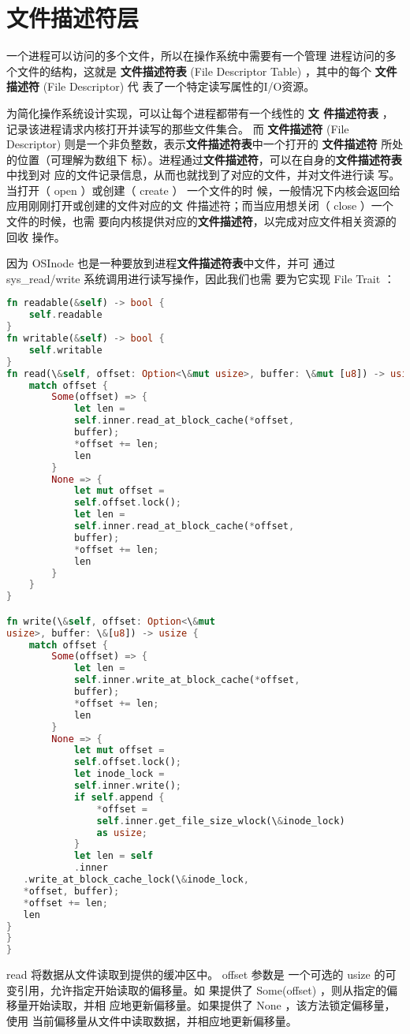 \section{文件描述符层}
一个进程可以访问的多个文件，所以在操作系统中需要有一个管理
进程访问的多个文件的结构，这就是 \textbf{文件描述符表} (File
Descriptor Table) ，其中的每个 \textbf{文件描述符} (File Descriptor) 代
表了一个特定读写属性的I/O资源。

为简化操作系统设计实现，可以让每个进程都带有一个线性的 \textbf{文
件描述符表} ，记录该进程请求内核打开并读写的那些文件集合。
而 \textbf{文件描述符} (File Descriptor) 则是一个非负整数，表示\textbf{文件描述符表}中一个打开的\textbf{ 文件描述符} 所处的位置（可理解为数组下
标）。进程通过\textbf{文件描述符}，可以在自身的\textbf{文件描述符表}中找到对
应的文件记录信息，从而也就找到了对应的文件，并对文件进行读
写。当打开（ open ）或创建（ create ） 一个文件的时
候，一般情况下内核会返回给应用刚刚打开或创建的文件对应的文
件描述符；而当应用想关闭（ close ）一个文件的时候，也需
要向内核提供对应的\textbf{文件描述符}，以完成对应文件相关资源的回收
操作。

因为 OSInode 也是一种要放到进程\textbf{文件描述符表}中文件，并可
通过 sys\_read/write 系统调用进行读写操作，因此我们也需
要为它实现 File Trait ：
\begin{lstlisting}[language=Rust]
fn readable(&self) -> bool {
	self.readable
}
fn writable(&self) -> bool {
	self.writable
}
fn read(\&self, offset: Option<\&mut usize>, buffer: \&mut [u8]) -> usize {
	match offset {
		Some(offset) => {
			let len =
			self.inner.read_at_block_cache(*offset,
			buffer);
			*offset += len;
			len
		}
		None => {
			let mut offset =
			self.offset.lock();
			let len =
			self.inner.read_at_block_cache(*offset,
			buffer);
			*offset += len;
			len
		}
	}
}

fn write(\&self, offset: Option<\&mut
usize>, buffer: \&[u8]) -> usize {
	match offset {
		Some(offset) => {
			let len =
			self.inner.write_at_block_cache(*offset,
			buffer);
			*offset += len;
			len
		}
		None => {
			let mut offset =
			self.offset.lock();
			let inode_lock =
			self.inner.write();
			if self.append {
				*offset =
				self.inner.get_file_size_wlock(\&inode_lock)
				as usize;
			}
			let len = self
			.inner
   .write_at_block_cache_lock(\&inode_lock,
   *offset, buffer);
   *offset += len;
   len
}
}
}
\end{lstlisting}

read 将数据从文件读取到提供的缓冲区中。 offset 参数是
一个可选的 usize 的可变引用，允许指定开始读取的偏移量。如
果提供了 Some(offset) ，则从指定的偏移量开始读取，并相
应地更新偏移量。如果提供了 None ，该方法锁定偏移量，使用
当前偏移量从文件中读取数据，并相应地更新偏移量。

